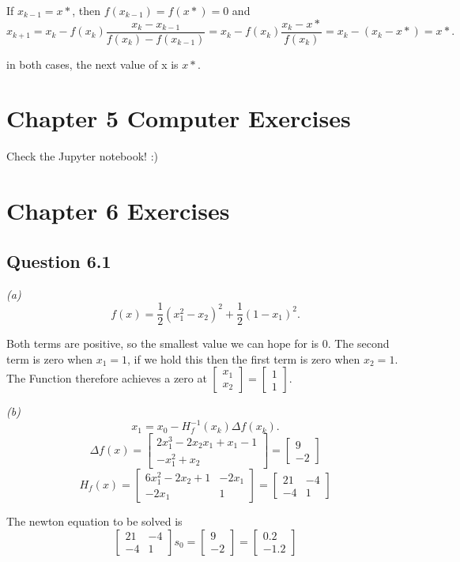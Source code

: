 \documentclass[12pt,a4paper]{report}
\begin{document}
If $x_{k-1} = x*$, then $f(x_{k-1}) = f(x*) = 0$ and
$$x_{k+1} = x_k - f(x_k)\frac{x_k - x_{k-1}}{f(x_k) - f(x_{k-1})} = x_k - f(x_k)\frac{x_k - x*}{f(x_k)}
= x_k - (x_k - x*) = x*.$$

in both cases, the next value of x is $x*$.


\section*{Chapter 5 Computer Exercises}
Check the Jupyter notebook! :)
\section*{Chapter 6 Exercises}
\subsection*{Question 6.1}
\textit{(a)} $$f (x) = \frac{1}{2}(x^2_1 - x_2 )^2 + \frac{1}{2}(1 - x_1 )^2 .$$

Both terms are positive, so the smallest value we can hope for is 0. The second
term is zero when $x_1 = 1$, if we hold this then the first term is zero when
$x_2 = 1$. The Function therefore achieves a zero at
$\left[\begin{smallmatrix}x_1\\x_2\end{smallmatrix}\right] = \left[\begin{smallmatrix}1\\1\end{smallmatrix}\right]$.

\textit{(b)} $$x_1 = x_0 - H_f^{-1}(x_k)\Delta f(x_k).$$
$$\Delta f(x) = \left[ \begin{smallmatrix} 2 x_1^3 - 2x_2 x_1 + x_1 - 1\\ -x^2_1 + x_2 \end{smallmatrix}\right] =
\left[ \begin{smallmatrix} 9 \\ -2 \end{smallmatrix}\right]$$
$$H_f(x) = \left[\begin{smallmatrix} 6x_1^2 - 2x_2 + 1 & -2x_1\\
-2x_1 & 1\end{smallmatrix}\right]=
\left[\begin{smallmatrix}
21 & -4\\
-4 & 1\end{smallmatrix}\right]$$

The newton equation to be solved is 
$$\left[\begin{smallmatrix}
21 & -4\\
-4 & 1\end{smallmatrix}\right]s_0 = \left[ \begin{smallmatrix} 9 \\ -2 \end{smallmatrix}\right]
=\left[ \begin{smallmatrix} 0.2 \\ -1.2 \end{smallmatrix}\right]$$
\end{document}
